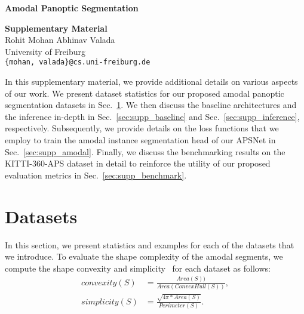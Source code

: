 \documentclass[10pt,twocolumn,letterpaper]{article}
\newcommand{\secref}[1]{Sec.~\ref{#1}}
\begin{document}
{\small


}

\flushcolsend
\pagebreak


\begin{strip}
\begin{center}


\vspace{-5ex}
\textbf{\Large \bf
Amodal Panoptic Segmentation} \\
\vspace*{12pt}

\Large{\bf Supplementary Material}\\
\vspace*{12pt}
\large{Rohit Mohan \qquad Abhinav Valada}\\
\large{University of Freiburg}\\
\vspace*{2pt}
\tt\small{\{mohan, valada\}@cs.uni-freiburg.de}

\end{center}
\end{strip}

\setcounter{section}{0}
\setcounter{equation}{0}
\setcounter{figure}{0}
\setcounter{table}{0}
\makeatletter





\normalsize

In this supplementary material, we provide additional details on various aspects of our work. We present dataset statistics for our proposed amodal panoptic segmentation datasets in \secref{sec:supp_dataset}. We then discuss the baseline architectures and the inference in-depth in \secref{sec:supp_baseline} and \secref{sec:supp_inference}, respectively. Subsequently, we provide details on the loss functions that we employ to train the amodal instance segmentation head of our APSNet in \secref{sec:supp_amodal}. Finally, we discuss the benchmarking results on the KITTI-360-APS dataset in detail to reinforce the utility of our proposed evaluation metrics in \secref{sec:supp_benchmark}.

\section{Datasets}
\label{sec:supp_dataset}

In this section, we present statistics and examples for each of the datasets that we introduce. To evaluate the shape complexity of the amodal segments, we compute the shape convexity and simplicity~\cite{zhu2017semantic} for each dataset as follows:
\begin{align}
  convexity(S) &= \frac{Area(S))}{Area(ConvexHull(S))}, \\
  simplicity(S) &= \frac{\sqrt{4\pi*Area(S)}}{Perimeter(S)}.
\end{align}
\end{document}
